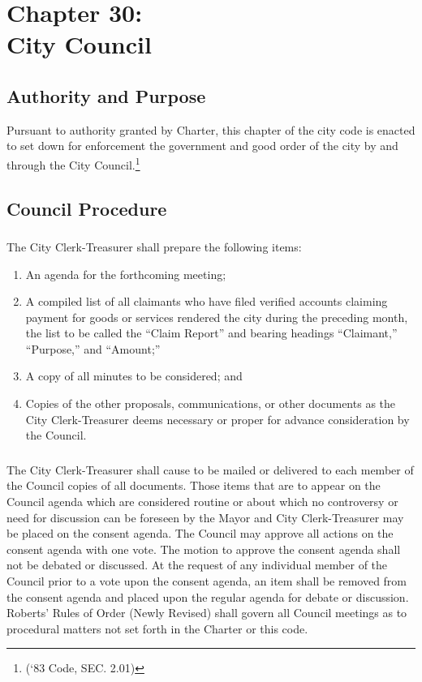 \chapter*{Chapter 30: \\
	City Council}
    \vfill
    \minitoc
    \pagebreak

\section{Authority and Purpose}
Pursuant to authority granted by Charter, this chapter of the city code is enacted to set down for enforcement the government and good order of the city by and through the City Council.\footnote{(‘83 Code, SEC. 2.01)}

\section{Council Procedure}
\subsection{}
The City Clerk-Treasurer shall prepare the following items:
\begin{enumerate}[{\indent}1)]
    \item An agenda for the forthcoming meeting;
    \item A compiled list of all claimants who have filed verified accounts claiming payment for goods or services rendered the city during the preceding month, the list to be called the “Claim Report” and bearing headings “Claimant,” “Purpose,” and “Amount;”
    \item A copy of all minutes to be considered; and
    \item Copies of the other proposals, communications, or other documents as the City Clerk-Treasurer deems necessary or proper for advance consideration by the Council.
\end{enumerate}
\subsection{}
The City Clerk-Treasurer shall cause to be mailed or delivered to each member of the Council copies of all documents.  Those items that are to appear on the Council agenda which are considered routine or about which no controversy or need for discussion can be foreseen by the Mayor and City Clerk-Treasurer may be placed on the consent agenda.  The Council may approve all actions on the consent agenda with one vote.  The motion to approve the consent agenda shall not be debated or discussed.  At the request of any individual member of the Council prior to a vote upon the consent agenda, an item shall be removed from the consent agenda and placed upon the regular agenda for debate or discussion.  Roberts’ Rules of Order (Newly Revised) shall govern all Council meetings as to procedural matters not set forth in the Charter or this code.
